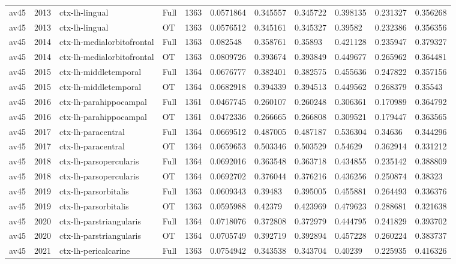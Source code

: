 \begin{landscape}
\begin{longtable}{lllllllllll}
av45 & 2013 & ctx-lh-lingual & Full & 1363 & 0.0571864 & 0.345557 & 0.345722 & 0.398135 & 0.231327 & 0.356268 \\
av45 & 2013 & ctx-lh-lingual & OT & 1363 & 0.0576512 & 0.345161 & 0.345327 & 0.39582 & 0.232386 & 0.356356 \\
av45 & 2014 & ctx-lh-medialorbitofrontal & Full & 1363 & 0.082548 & 0.358761 & 0.35893 & 0.421128 & 0.235947 & 0.379327 \\
av45 & 2014 & ctx-lh-medialorbitofrontal & OT & 1363 & 0.0809726 & 0.393674 & 0.393849 & 0.449677 & 0.265962 & 0.364481 \\
av45 & 2015 & ctx-lh-middletemporal & Full & 1364 & 0.0676777 & 0.382401 & 0.382575 & 0.455636 & 0.247822 & 0.357156 \\
av45 & 2015 & ctx-lh-middletemporal & OT & 1364 & 0.0682918 & 0.394339 & 0.394513 & 0.449562 & 0.268379 & 0.35543 \\
av45 & 2016 & ctx-lh-parahippocampal & Full & 1361 & 0.0467745 & 0.260107 & 0.260248 & 0.306361 & 0.170989 & 0.364792 \\
av45 & 2016 & ctx-lh-parahippocampal & OT & 1361 & 0.0472336 & 0.266665 & 0.266808 & 0.309521 & 0.179447 & 0.363565 \\
av45 & 2017 & ctx-lh-paracentral & Full & 1364 & 0.0669512 & 0.487005 & 0.487187 & 0.536304 & 0.34636 & 0.344296 \\
av45 & 2017 & ctx-lh-paracentral & OT & 1364 & 0.0659653 & 0.503346 & 0.503529 & 0.54629 & 0.362914 & 0.331212 \\
av45 & 2018 & ctx-lh-parsopercularis & Full & 1364 & 0.0692016 & 0.363548 & 0.363718 & 0.434855 & 0.235142 & 0.388809 \\
av45 & 2018 & ctx-lh-parsopercularis & OT & 1364 & 0.0692702 & 0.376044 & 0.376216 & 0.436256 & 0.250874 & 0.38323 \\
av45 & 2019 & ctx-lh-parsorbitalis & Full & 1363 & 0.0609343 & 0.39483 & 0.395005 & 0.455881 & 0.264493 & 0.336376 \\
av45 & 2019 & ctx-lh-parsorbitalis & OT & 1363 & 0.0595988 & 0.42379 & 0.423969 & 0.479623 & 0.288681 & 0.321638 \\
av45 & 2020 & ctx-lh-parstriangularis & Full & 1364 & 0.0718076 & 0.372808 & 0.372979 & 0.444795 & 0.241829 & 0.393702 \\
av45 & 2020 & ctx-lh-parstriangularis & OT & 1364 & 0.0705749 & 0.392719 & 0.392894 & 0.457228 & 0.260224 & 0.383737 \\
av45 & 2021 & ctx-lh-pericalcarine & Full & 1363 & 0.0754942 & 0.343538 & 0.343704 & 0.40239 & 0.225935 & 0.416326 \\

\end{longtable}
\end{landscape}
